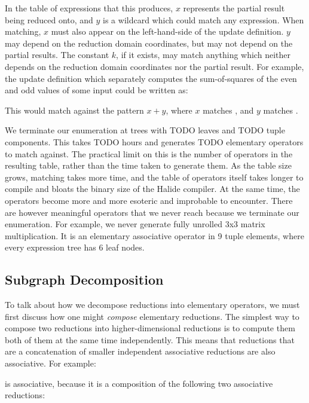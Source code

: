 In the table of expressions that this produces, $x$ represents the partial result being reduced onto, and $y$ is a wildcard which could match any expression. When matching, $x$ must also appear on the left-hand-side of the update definition. $y$ may depend on the reduction domain coordinates, but may not depend on the partial results. The constant $k$, if it exists, may match anything which neither depends on the reduction domain coordinates nor the partial result. For example, the update definition which separately computes the sum-of-squares of the even and odd values of some input  could be written as:


This would match against the pattern $x + y$, where $x$ matches , and $y$ matches .

We terminate our enumeration at trees with TODO leaves and TODO tuple components. This takes TODO hours and generates TODO elementary operators to match against. The practical limit on this is the number of operators in the resulting table, rather than the time taken to generate them. As the table size grows, matching takes more time, and the table of operators itself takes longer to compile and bloats the binary size of the Halide compiler. At the same time, the operators become more and more esoteric and improbable to encounter. There are however meaningful operators that we never reach because we terminate our enumeration. For example, we never generate fully unrolled 3x3 matrix multiplication. It is an elementary associative operator in 9 tuple elements, where every expression tree has 6 leaf nodes.

\subsection{Subgraph Decomposition}
\label{subsec:decomposition}

To talk about how we decompose reductions into elementary operators, we must first discuss how one might \emph{compose} elementary reductions. The simplest way to compose two reductions into higher-dimensional reductions is to compute them both of them at the same time independently. This means that reductions that are a concatenation of smaller independent associative reductions are also associative. For example:


is associative, because it is a composition of the following two associative reductions:

